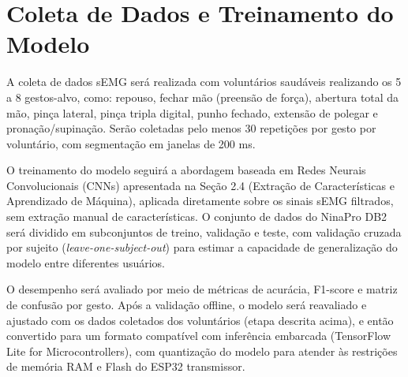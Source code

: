 \section{Coleta de Dados e Treinamento do Modelo}
A coleta de dados sEMG será realizada com voluntários saudáveis realizando os 5 a 8 gestos-alvo, como: repouso, fechar mão (preensão de força), abertura total da mão, pinça lateral, pinça tripla digital, punho fechado, extensão de polegar e pronação/supinação\cite{Rehman}. Serão coletadas pelo menos 30 repetições por gesto por voluntário, com segmentação em janelas de 200 ms.

O treinamento do modelo seguirá a abordagem baseada em Redes Neurais Convolucionais (CNNs) apresentada na Seção 2.4 (Extração de Características e Aprendizado de Máquina), aplicada diretamente sobre os sinais sEMG filtrados, sem extração manual de características. O conjunto de dados do NinaPro DB2 será dividido em subconjuntos de treino, validação e teste, com validação cruzada por sujeito (\textit{leave-one-subject-out}) para estimar a capacidade de generalização do modelo entre diferentes usuários.

O desempenho será avaliado por meio de métricas de acurácia, F1-score e matriz de confusão por gesto. Após a validação offline, o modelo será reavaliado e ajustado com os dados coletados dos voluntários (etapa descrita acima), e então convertido para um formato compatível com inferência embarcada (TensorFlow Lite for Microcontrollers), com quantização do modelo para atender às restrições de memória RAM e Flash do ESP32 transmissor.